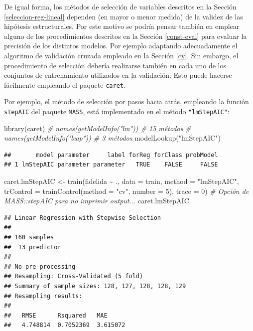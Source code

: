 \documentclass[
]{book}
\newenvironment{Shaded}{\begin{snugshade}}{\end{snugshade}}
\newcommand{\AttributeTok}[1]{\textcolor[rgb]{0.77,0.63,0.00}{#1}}
\newcommand{\CommentTok}[1]{\textcolor[rgb]{0.56,0.35,0.01}{\textit{#1}}}
\newcommand{\DecValTok}[1]{\textcolor[rgb]{0.00,0.00,0.81}{#1}}
\newcommand{\FunctionTok}[1]{\textcolor[rgb]{0.00,0.00,0.00}{#1}}
\newcommand{\NormalTok}[1]{#1}
\newcommand{\OtherTok}[1]{\textcolor[rgb]{0.56,0.35,0.01}{#1}}
\newcommand{\SpecialCharTok}[1]{\textcolor[rgb]{0.00,0.00,0.00}{#1}}
\newcommand{\StringTok}[1]{\textcolor[rgb]{0.31,0.60,0.02}{#1}}
\theoremstyle{break}
\theoremstyle{definition}
\theoremstyle{definition}
\theoremstyle{definition}
\theoremstyle{definition}
\theoremstyle{remark}
\begin{document}
De igual forma, los métodos de selección de variables descritos en la Sección \ref{seleccion-reg-lineal} dependen (en mayor o menor medida) de la validez de las hipótesis estructurales.
Por este motivo se podría pensar también en emplear alguno de los procedimientos descritos en la Sección \ref{const-eval} para evaluar la precisión de los distintos modelos.
Por ejemplo adaptando adecuadamente el algoritmo de validación cruzada empleado en la Sección \ref{cv}.
Sin embargo, el procedimiento de selección debería realizarse también en cada uno de los conjuntos de entrenamiento utilizados en la validación.
Esto puede hacerse fácilmente empleando el paquete \texttt{caret}.

Por ejemplo, el método de selección por pasos hacia atrás, empleando la función \texttt{stepAIC} del paquete \texttt{MASS}, está implementado en el método \texttt{"lmStepAIC"}:

\begin{Shaded}
\begin{Highlighting}[]
\FunctionTok{library}\NormalTok{(caret)}
\CommentTok{\# names(getModelInfo("lm")) \# 15 métodos}
\CommentTok{\# names(getModelInfo("leap")) \# 3 métodos}
\FunctionTok{modelLookup}\NormalTok{(}\StringTok{"lmStepAIC"}\NormalTok{) }
\end{Highlighting}
\end{Shaded}

\begin{verbatim}
##       model parameter     label forReg forClass probModel
## 1 lmStepAIC parameter parameter   TRUE    FALSE     FALSE
\end{verbatim}

\begin{Shaded}
\begin{Highlighting}[]
\NormalTok{caret.lmStepAIC }\OtherTok{\textless{}{-}} \FunctionTok{train}\NormalTok{(fidelida }\SpecialCharTok{\textasciitilde{}}\NormalTok{ ., }\AttributeTok{data =}\NormalTok{ train, }\AttributeTok{method =} \StringTok{"lmStepAIC"}\NormalTok{,}
                   \AttributeTok{trControl =} \FunctionTok{trainControl}\NormalTok{(}\AttributeTok{method =} \StringTok{"cv"}\NormalTok{, }\AttributeTok{number =} \DecValTok{5}\NormalTok{),}
                   \AttributeTok{trace =} \DecValTok{0}\NormalTok{) }\CommentTok{\# Opción de MASS::stepAIC para no imprimir output...}
\NormalTok{caret.lmStepAIC}
\end{Highlighting}
\end{Shaded}

\begin{verbatim}
## Linear Regression with Stepwise Selection 
## 
## 160 samples
##  13 predictor
## 
## No pre-processing
## Resampling: Cross-Validated (5 fold) 
## Summary of sample sizes: 128, 127, 128, 128, 129 
## Resampling results:
## 
##   RMSE      Rsquared   MAE     
##   4.748814  0.7052369  3.615072
\end{verbatim}
\end{document}

